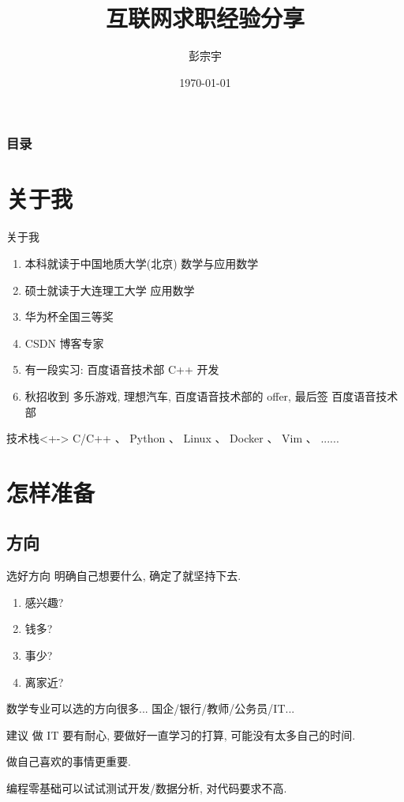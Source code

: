 \documentclass{ctexbeamer}
\title[互联网求职经验分享]{互联网求职经验分享}
\author[彭宗宇]{彭宗宇}
\institute[DLUT]{%
	大连理工大学
}
\date{\today}
\begin{document}
\maketitle

\begin{frame}
	\frametitle{\textbf{目录}}
	\tableofcontents
\end{frame}


\section{关于我}
\begin{frame}{关于我}
	\begin{enumerate}[<+-| alert@+>]
		\item 本科就读于中国地质大学(北京) 数学与应用数学
		\item 硕士就读于大连理工大学  应用数学
		\item 华为杯全国三等奖
		\item CSDN 博客专家
		\item 有一段实习: 百度语音技术部 C++ 开发
		\item 秋招收到 多乐游戏, 理想汽车, 百度语音技术部的 offer,  最后签 百度语音技术部
	\end{enumerate}

	\begin{block}{技术栈}<+->
		C/C++ 、 Python 、 Linux 、 Docker 、 Vim 、 ......
	\end{block}
\end{frame}




\section{怎样准备}


\subsection{方向}
\begin{frame}{选好方向}
	明确自己想要什么, 确定了就坚持下去.
	\begin{enumerate}
		\item 感兴趣?
		\item 钱多?
		\item 事少?
		\item 离家近?
	\end{enumerate}

	数学专业可以选的方向很多... 国企/银行/教师/公务员/IT...

	\begin{exampleblock}{建议}
		做 IT 要有耐心, 要做好一直学习的打算,
		可能没有太多自己的时间.

		做自己喜欢的事情更重要.

		编程零基础可以试试测试开发/数据分析, 对代码要求不高.
	\end{exampleblock}
\end{frame}
\end{document}
